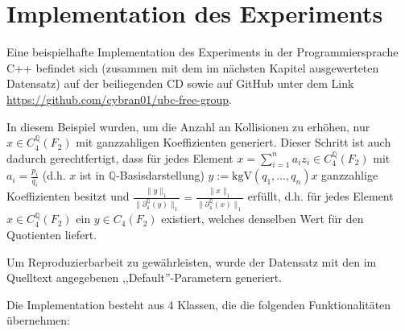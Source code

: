 \documentclass[a4paper,twoside,10pt]{scrreprt}
\newcommand{\Q}{\mathbb{Q}}
\theoremstyle{definition}
\begin{document}
\section{Implementation des Experiments}
Eine beispielhafte Implementation des Experiments in der Programmiersprache C++ befindet sich (zusammen mit dem im nächsten Kapitel ausgewerteten Datensatz) auf der beiliegenden CD sowie auf GitHub unter dem Link \url{https://github.com/cybran01/ubc-free-group}.
\par
In diesem Beispiel wurden, um die Anzahl an Kollisionen zu erhöhen, nur $x\in C_4^{\Q}(F_2)$ mit ganzzahligen Koeffizienten generiert. Dieser Schritt ist auch dadurch gerechtfertigt, dass für jedes Element $x=\sum\limits_{i=1}^na_iz_i\in C_4^{\Q}(F_2)$ mit $a_i=\frac{p_i}{q_i}$ (d.h. $x$ ist in $\Q$-Basisdarstellung) $y:=\text{kgV}(q_1,\ldots,q_n)x$ ganzzahlige Koeffizienten besitzt und $\frac{\|y\|_1}{\|\partial_4^{\Q}(y)\|_1}=\frac{\|x\|_1}{\|\partial_4^{\Q}(x)\|_1}$ erfüllt, d.h. für jedes Element $x\in C_4^{\Q}(F_2)$ ein $y\in C_4(F_2)$ existiert, welches denselben Wert für den Quotienten liefert.\par 
Um Reproduzierbarbeit zu gewährleisten, wurde der Datensatz mit den im Quelltext angegebenen ,,Default''-Parametern generiert.
\par
Die Implementation besteht aus 4 Klassen, die die folgenden Funktionalitäten übernehmen:
\end{document}

